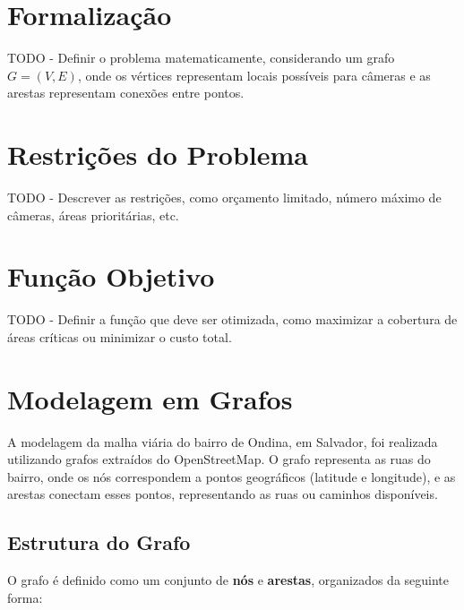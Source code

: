 \documentclass[12pt, a4paper]{report}
\begin{document}
\section{Formalização}
TODO - Definir o problema matematicamente, considerando um grafo \(G = (V, E)\), onde os vértices representam locais possíveis para câmeras e as arestas representam conexões entre pontos.

\section{Restrições do Problema}
TODO - Descrever as restrições, como orçamento limitado, número máximo de câmeras, áreas prioritárias, etc.

\section{Função Objetivo}
TODO - Definir a função que deve ser otimizada, como maximizar a cobertura de áreas críticas ou minimizar o custo total.

\section{Modelagem em Grafos}

A modelagem da malha viária do bairro de Ondina, em Salvador, foi realizada utilizando grafos extraídos do OpenStreetMap. O grafo representa as ruas do bairro, onde os nós correspondem a pontos geográficos (latitude e longitude), e as arestas conectam esses pontos, representando as ruas ou caminhos disponíveis.

\subsection{Estrutura do Grafo}

O grafo é definido como um conjunto de \textbf{nós} e \textbf{arestas}, organizados da seguinte forma:
\end{document}
